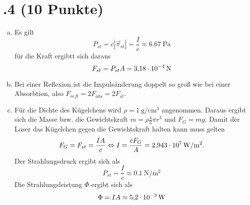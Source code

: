 \section*{\nr.4 \titfour (10 Punkte)}
\begin{enumerate}[(a)]
\item Es gilt
\begin{equation}
	P_{st} = c|{\vec{\pi}_{st}}| = \frac{I}{c} \approx \SI{6,67}{\pascal}
\end{equation}
für die Kraft ergibtt sich daraus
\begin{equation}
	F_{st} = P_{st}A = \SI{3,18E-4}{\newton}
\end{equation}
\item Bei einer Reflexion ist die Impulsänderung doppelt so groß wie bei einer Absorbtion, also $F_{refl} = 2F_{abs} = 2F_{st}$.
\item Für die Dichte des Kügelchens wird $\rho = \SI{1}{\gram \per \centi\metre ^3}$ angenommen. Daraus ergibt sich die Masse bzw. die Gewichtskraft $m = \rho \frac{4}{3} \pi r^3$ und $F_G = mg$. Damit der Laser das Kügelchen gegen die Gewichtskraft halten kann muss gelten
\begin{equation}
	F_G= F_{st} = \frac{IA}{c} \Leftrightarrow I = \frac{cF_G}{A} =\SI{2,943E7}{\watt\per\square\metre}.
\end{equation}
Der Strahlungsdruck ergibt sich als
\begin{equation}
	P_{st} = \frac{I}{c} \approx \SI{0,1}{\newton\per\square\metre}
\end{equation}
Die Strahlungsleistung $\Phi$ ergibt sich als
\begin{equation}
	\Phi = IA \approx \SI{5,2E-3}{\watt}
\end{equation}
\end{enumerate}
